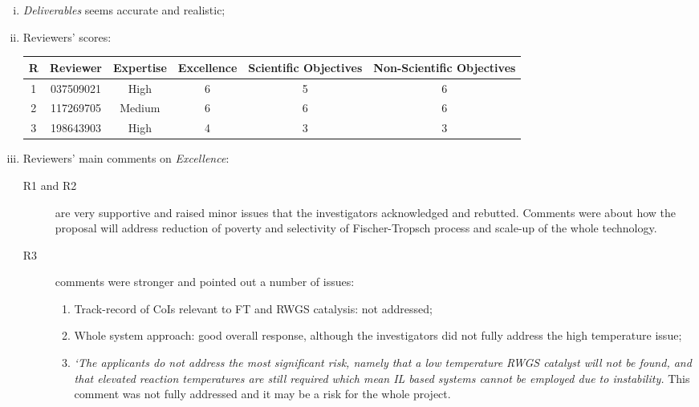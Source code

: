 \documentclass[14pt,twoside]{report}
\begin{document}
\begin{enumerate}[(i)]
   \item {\it Deliverables} seems accurate and realistic;
%
   \item Reviewers' scores:
       \begin{center}
          \begin{tabular}{c c | c c c c }
              \hline
               {\bf R} & {\bf Reviewer} & {\bf Expertise} & {\bf Excellence}  & {\bf Scientific Objectives} & {\bf Non-Scientific Objectives} \\ 
              \hline
                 1     &  037509021    &  High           &      6            &          5                  &         6                       \\
                 2     &  117269705    &  Medium         &      6            &          6                  &         6                       \\
                 3     &  198643903    &  High           &      4            &          3                  &         3                       \\
              \hline
          \end{tabular}
       \end{center}
%
   \item Reviewers' main comments on {\it Excellence}:
       \begin{description}
%         
          \item[R1 and R2] are very supportive and raised minor issues that the investigators acknowledged and rebutted. Comments were about how the proposal will address reduction of poverty and selectivity of Fischer-Tropsch process and scale-up of the whole technology.
%
         \item[R3] comments were stronger and pointed out a number of issues:
             \begin{enumerate}
                \item Track-record of CoIs relevant to FT and RWGS catalysis: not addressed;
                \item Whole system approach: good overall response, although the investigators did not fully address the high temperature issue;
                \item {\it `The applicants do not address the most significant risk, namely that a low temperature RWGS catalyst will not be found, and that elevated reaction temperatures are still required which mean IL based systems cannot be employed due to
instability.} This comment was not fully addressed and it may be a risk for the whole project.
             \end{enumerate} 



\end{description}
\end{enumerate}
\end{document}
